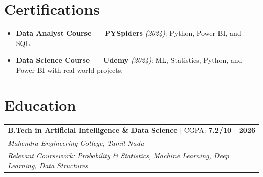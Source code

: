 \documentclass[letterpaper,10pt]{article}
\begin{document}
\vspace{2pt}

\section*{Certifications}
\begin{itemize}[leftmargin=*, noitemsep, topsep=1pt]
    \item \textbf{Data Analyst Course — PYSpiders} \textit{(2024)}: Python, Power BI, and SQL.
    \item \textbf{Data Science Course — Udemy} \textit{(2024)}: ML, Statistics, Python, and Power BI with real-world projects.
\end{itemize}

\vspace{2pt}

\section*{Education}
\begin{tabularx}{\textwidth}{@{}X r@{}}
    \textbf{B.Tech in Artificial Intelligence \& Data Science} $|$ CGPA: \textbf{7.2/10} & \textbf{2026} \\
    \textit{Mahendra Engineering College, Tamil Nadu} & \\
    \small \textit{Relevant Coursework: Probability \& Statistics, Machine Learning, Deep Learning, Data Structures} & \\
\end{tabularx}
\end{document}
